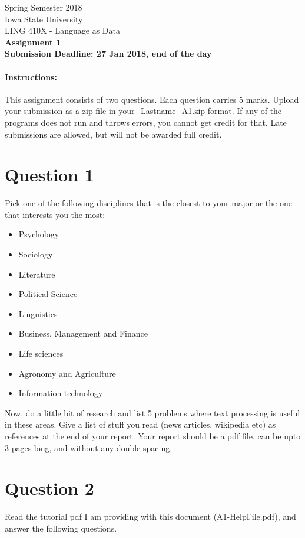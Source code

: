 \documentclass[11pt,a4paper]{article}
\begin{document}
\begin{center}
  Spring Semester 2018 \\ Iowa State University\\[3ex]
  {\large LING 410X - Language as Data}\\[3ex]
  \textbf{Assignment 1} \\ \textbf{Submission Deadline: 27 Jan 2018, end of the day}
\end{center}


\paragraph{Instructions:} This assignment consists of two questions. Each question carries 5 marks. Upload your submission as a zip file in your\_Lastname\_A1.zip format. If any of the programs does not run and throws errors, you cannot get credit for that. Late submissions are allowed, but will not be awarded full credit.

\section*{Question 1} 
Pick one of the following disciplines that is the closest to your major or the one that interests you the most:
\begin{itemize}
\item Psychology
\item Sociology
\item Literature
\item Political Science
\item Linguistics
\item Business, Management and Finance
\item Life sciences
\item Agronomy and Agriculture
\item Information technology
\end{itemize}
Now, do a little bit of research and list 5 problems where text processing is useful in these areas. Give a list of stuff you read (news articles, wikipedia etc) as references at the end of your report. Your report should be a pdf file, can be upto 3 pages long, and without any double spacing.

\section*{Question 2}
Read the tutorial pdf I am providing with this document (A1-HelpFile.pdf), and answer the following questions. 
\end{document}
